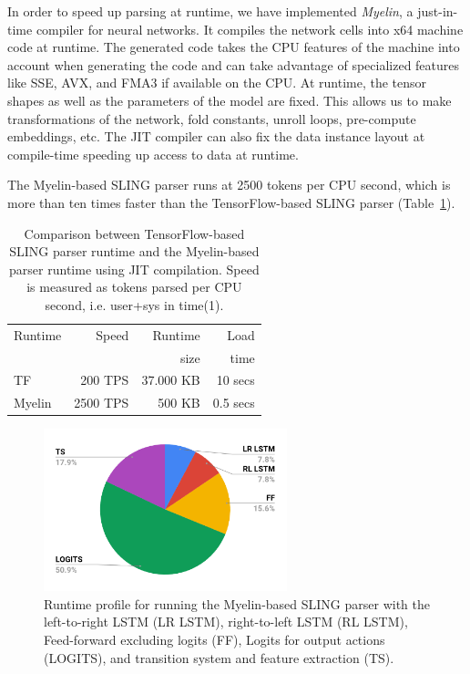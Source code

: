 \documentclass[11pt,a4paper]{article}
\begin{document}
In order to speed up parsing at runtime, we have implemented \emph{Myelin}, a
just-in-time compiler for neural networks. It compiles the network cells into
x64 machine code at runtime. The generated code takes the CPU features of the
machine into account when generating the code and can take advantage of
specialized features like SSE, AVX, and FMA3 if available on the CPU.
At runtime, the tensor shapes as well as the parameters of the model are
fixed.
This allows us to make transformations of the network, fold constants, unroll
loops, pre-compute embeddings, etc. The JIT compiler can also fix the data
instance layout at compile-time speeding up access to data at runtime.

The Myelin-based SLING parser runs at 2500 tokens per CPU second, which is more
than ten times faster than the TensorFlow-based SLING parser
(Table~\ref{tab:runtime}).

\begin{table}[!t]
\centering
\begin{tabular}{|l|r|r|r|}
\hline
Runtime    & Speed     & Runtime      & Load      \\
           &           & size         & time      \\
\hline
TF         &  200 TPS  & 37.000 KB    & 10 secs   \\
Myelin     & 2500 TPS  &    500 KB    & 0.5 secs  \\
\hline
\end{tabular}
\caption{Comparison between TensorFlow-based SLING parser runtime and the
Myelin-based parser runtime using JIT compilation.
Speed is measured as tokens parsed per CPU second, i.e. user+sys in time(1).}
\label{tab:runtime}
\end{table}

\begin{figure}[t]
  \centering
  \includegraphics[width = 200pt]{runtime.pdf}
  \caption{Runtime profile for running the Myelin-based SLING parser with the
  left-to-right LSTM (LR LSTM), right-to-left LSTM (RL LSTM), Feed-forward
  excluding logits (FF), Logits for output actions (LOGITS), and transition
  system and feature extraction (TS).}
  \label{fig:runtime}
\end{figure}
\end{document}
